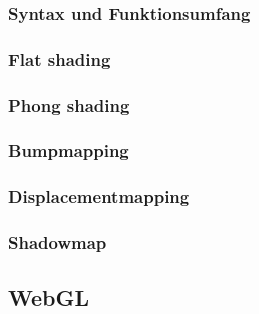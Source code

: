 \subsubsection{Syntax und Funktionsumfang}
\subsubsection{Flat  shading}
\subsubsection{Phong  shading}
\subsubsection{Bumpmapping}
\subsubsection{Displacementmapping}
\subsubsection{Shadowmap}


\subsection{WebGL}
